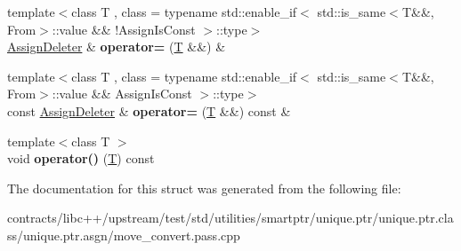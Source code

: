 \begin{DoxyCompactItemize}
\item 
\mbox{\label{struct_assign_deleter_a025db4919c30f6d81f1f848d14a0878d}} 
{\footnotesize template$<$class T , class  = typename std\+::enable\+\_\+if$<$      std\+::is\+\_\+same$<$\+T\&\&, From$>$\+::value \&\& !\+Assign\+Is\+Const    $>$\+::type$>$ }\\\mbox{\hyperlink{struct_assign_deleter}{Assign\+Deleter}} \& {\bfseries operator=} (\mbox{\hyperlink{struct_t}{T}} \&\&) \&
\item 
\mbox{\label{struct_assign_deleter_a42cad6cc4409ab579d56c99b38e22021}} 
{\footnotesize template$<$class T , class  = typename std\+::enable\+\_\+if$<$      std\+::is\+\_\+same$<$\+T\&\&, From$>$\+::value \&\& Assign\+Is\+Const    $>$\+::type$>$ }\\const \mbox{\hyperlink{struct_assign_deleter}{Assign\+Deleter}} \& {\bfseries operator=} (\mbox{\hyperlink{struct_t}{T}} \&\&) const \&
\item 
\mbox{\label{struct_assign_deleter_ab05f903ab805b8cc64a74fa9f4919192}} 
{\footnotesize template$<$class T $>$ }\\void {\bfseries operator()} (\mbox{\hyperlink{struct_t}{T}}) const
\end{DoxyCompactItemize}


The documentation for this struct was generated from the following file\+:\begin{DoxyCompactItemize}
\item 
contracts/libc++/upstream/test/std/utilities/smartptr/unique.\+ptr/unique.\+ptr.\+class/unique.\+ptr.\+asgn/move\+\_\+convert.\+pass.\+cpp\end{DoxyCompactItemize}
